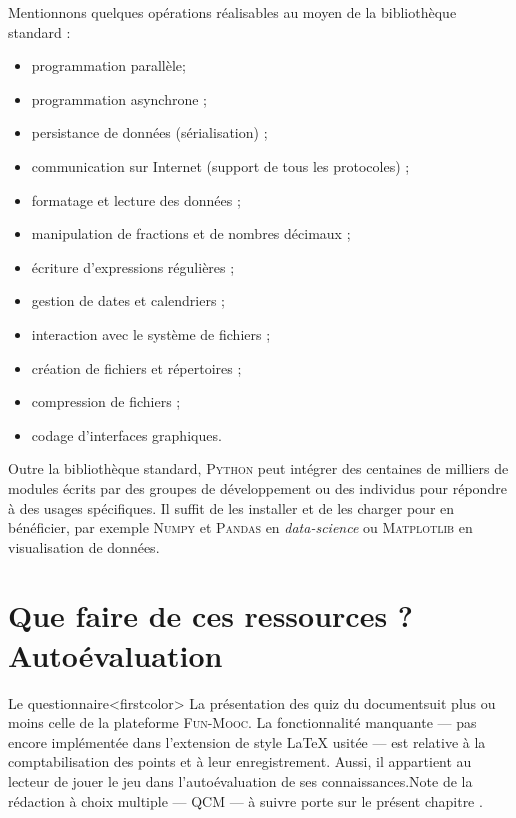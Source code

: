 Mentionnons quelques opérations réalisables au moyen de la bibliothèque standard :
\begin{itemize}\jazzitem
\item programmation parallèle;
\item programmation asynchrone ;
\item persistance de données (sérialisation) ;
\item communication sur Internet (support de tous les protocoles) ;
\item formatage et lecture des données ;
\item manipulation de fractions et de nombres décimaux ;
\item écriture d'expressions régulières ;
\item gestion de dates et calendriers ;
\item interaction avec le système de fichiers ;
\item création de fichiers et répertoires ;
\item compression de fichiers ;
\item codage d'interfaces graphiques.
\end{itemize}

Outre la bibliothèque standard, \textsc{Python} peut intégrer des centaines de milliers de modules écrits par des groupes de développement ou des individus pour répondre à des usages spécifiques. Il suffit de les installer et de les charger pour en bénéficier, par exemple \textsc{Numpy} et \textsc{Pandas} en \textit{data-science} ou \textsc{Matplotlib} en visualisation de données.




\section[Que faire de ces ressources ? Quiz]{Que faire de ces ressources ? Autoévaluation}
\label{sec:XI.5}

Le questionnaire\caution[t]<firstcolor>{%
La présentation des quiz du document\linebreak suit plus ou moins celle de la platefor\-me \textsc{Fun-Mooc}. La fonctionnalité manquante --- pas encore implémentée dans l'extension de style \LaTeX{} usitée --- est relative à la comptabilisation des points et à leur enregistrement. Aussi, il appartient au lecteur de jouer le jeu dans l'auto\-évaluation de ses connaissances.}{Note de la rédaction}
à choix multiple%
--- QCM --- à suivre porte sur le présent chapitre .
\parnotes

